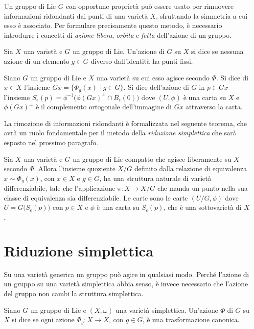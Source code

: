 Un gruppo di Lie $G$ con opportune proprietà può essere usato per rimuovere informazioni ridondanti dai punti di una varietà $X$, sfruttando la simmetria a cui esso è associato. Per formulare precisamente questo metodo, è necessario introdurre i concetti di \emph{azione libera}, \emph{orbita} e \emph{fetta} dell'azione di un gruppo.
\begin{definition}
  Sia $X$ una varietà e $G$ un gruppo di Lie. Un'azione di $G$ su $X$ si dice  se nessuna azione di un elemento $g \in G$ diverso dall'identità ha punti fissi.
\end{definition}
\begin{definition}
  Siano $G$ un gruppo di Lie e $X$ una varietà su cui esso agisce secondo $\Phi$. Si dice  di $x \in X$ l'insieme $Gx = \{ \Phi_g(x)\mid g \in G\}$. Si dice  dell'azione di $G$ in $p \in Gx$ l'insieme $S_{\epsilon}(p) = \phi^{-1}\big(\phi(Gx)^{\perp} \cap B_{\epsilon}(0)\big)$ dove $(U,\phi)$ è una carta su $X$ e $\phi(Gx)^{\perp}$ è il complemento ortogonale dell'immagine di $Gx$ attraverso la carta.
\end{definition}

La rimozione di informazioni ridondanti è formalizzata nel seguente teorema, che avrà un ruolo fondamentale per il metodo della \emph{riduzione simplettica} che sarà esposto nel prossimo paragrafo.
\begin{theorem}
  Sia $X$ una varietà e $G$ un gruppo di Lie compatto che agisce liberamente su $X$ secondo $\Phi$. Allora l'insieme quoziente $X/G$ definito dalla relazione di equivalenza $x \sim \Phi_g(x)$, con $x \in X$ e $g \in G$, ha una struttura naturale di varietà differenziabile, tale che l'applicazione $\pi:X \to X /G$ che manda un punto nella sua classe di equivalenza sia differenziabile. Le carte sono le carte $(U/G,\phi)$ dove $U = G\big(S_{\epsilon}(p)\big)$ con $p \in X$ e $\phi$ è una carta su $S_{\epsilon}(p)$, che è una sottovarietà di $X$.
\end{theorem}

\section{Riduzione simplettica}
Su una varietà generica un gruppo può agire in qualsiasi modo. Perché l'azione di un gruppo su una varietà simplettica abbia senso, è invece necessario che l'azione del gruppo non cambi la struttura simplettica.
\begin{definition}
  Siano $G$ un gruppo di Lie e $(X, \omega)$ una varietà simplettica. Un'azione $\Phi$ di $G$ su $X$ si dice  se ogni azione $\Phi_g:X\to X$, con $g \in G$, è una trasformazione canonica.
\end{definition}

